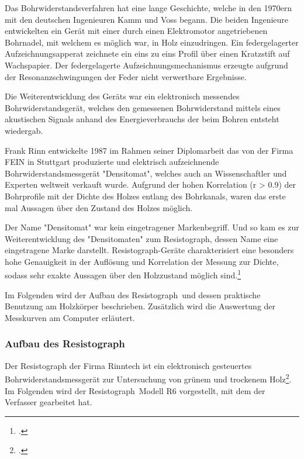 \documentclass[a4paper, halfparskip]{article}
\def\SymbReg{\textsuperscript{\textregistered}}
\begin{document}
Das Bohrwiderstandsverfahren hat eine lange Geschichte, welche in den 1970ern
mit den deutschen Ingenieuren Kamm und Voss begann. Die beiden Ingenieure
entwickelten ein Gerät mit einer durch einen Elektromotor angetriebenen
Bohrnadel, mit welchem es möglich war, in Holz einzudringen. Ein
federgelagerter Aufzeichnungsapperat zeichnete ein eins zu eins Profil über
einen Kratzstift auf Wachspapier. Der federgelagerte Aufzeichnungsmechanismus
erzeugte aufgrund der Resonanzschwingungen der Feder nicht verwertbare
Ergebnisse. 

Die Weiterentwicklung des Geräts war ein elektronisch messendes
Bohrwiderstandsgerät, welches den gemessenen Bohrwiderstand mittels eines
akustischen Signals anhand des Energieverbrauchs der beim Bohren entsteht
wiedergab.

Frank Rinn entwickelte 1987 im Rahmen seiner Diplomarbeit das von der Firma
FEIN in Stuttgart produzierte und elektrisch aufzeichnende
Bohrwiderstandsmessgerät "Densitomat", welches auch an Wissenschaftler und
Experten weltweit verkauft wurde. Aufgrund der hohen Korrelation (r
\textgreater{} 0.9) der Bohrprofile mit der Dichte des Holzes entlang des
Bohrkanals, waren das erste mal Aussagen über den Zustand des Holzes möglich.

Der Name "Densitomat" war kein eingetragener Markenbegriff. Und so kam es zur
Weiterentwicklung des "Densitomaten" zum Resistograph\SymbReg, dessen Name
eine eingetragene Marke darstellt. Resistograph\SymbReg-Geräte charakterisiert
eine besonders hohe Genauigkeit in der Auflösung und Korrelation der Messung
zur Dichte, sodass sehr exakte Aussagen über den Holzzustand möglich
sind.\footcite{rinn:resi_drill_transition}

Im Folgenden wird der Aufbau des Resistograph\SymbReg\ und dessen praktische
Benutzung am Holzkörper beschrieben. Zusätzlich wird die Auswertung der
Messkurven am Computer erläutert. 

\subsubsection{Aufbau des Resistograph\SymbReg}
Der Resistograph der Firma Rinntech ist ein elektronisch gesteuertes
Bohrwiderstandsmessgerät zur Untersuchung von grünem und trockenem
Holz\footcite{rinn:risserkennung}. Im Folgenden wird der Resistograph\SymbReg\
Modell R6 vorgestellt, mit dem der Verfasser gearbeitet hat.
\end{document}
